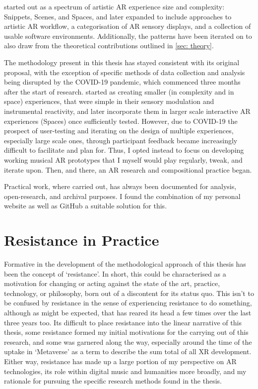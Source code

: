started out as a spectrum of artistic AR experience size and complexity: Snippets, Scenes, and Spaces, and later expanded to include approaches to artistic AR workflow, a categorisation of AR sensory displays, and a collection of usable software environments. Additionally, the patterns have been iterated on to also draw from the theoretical contributions outlined in \autoref{sec: theory}.

The methodology present in this thesis has stayed consistent with its original proposal, with the exception of specific methods of data collection and analysis being disrupted by the COVID-19 pandemic, which commenced three months after the start of research. started as creating smaller (in complexity and in space) experiences, that were simple in their sensory modulation and instrumental reactivity, and later incorporate them in larger scale interactive AR experiences (Spaces) once sufficiently tested. However, due to COVID-19 the prospect of user-testing and iterating on the design of multiple experiences, especially large scale ones, through participant feedback became increasingly difficult to facilitate and plan for. Thus, I opted instead to focus on developing working musical AR prototypes that I myself would play regularly, tweak, and iterate upon. Then, and there, an AR research and compositional practice began.

Practical work, where carried out, has always been documented for analysis, open-research, and archival purposes. I found the combination of my personal website as well as GitHub a suitable solution for this.




\section{Resistance in Practice}
Formative in the development of the methodological approach of this thesis has been the concept of `resistance'. In short, this could be characterised as a motivation for changing or acting against the state of the art, practice, technology, or philosophy, born out of a discontent for its status quo. This isn't to be confused by resistance in the sense of experiencing resistance to do something, although as might be expected, that has reared its head a few times over the last three years too. Its difficult to place resistance into the linear narrative of this thesis, some resistance formed my initial motivations for the carrying out of this research, and some was garnered along the way, especially around the time of the uptake in `Metaverse' as a term to describe the sum total of all XR development. Either way, resistance has made up a large portion of my perspective on AR technologies, its role within digital music and humanities more broadly, and my rationale for pursuing the specific research methods found in the thesis.

